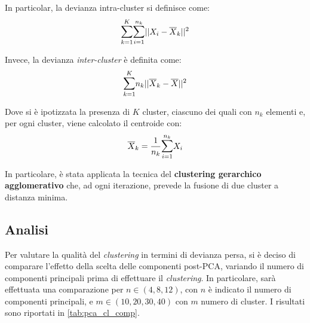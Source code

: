 In particolar, la devianza intra-cluster si definisce come:
\begin{equation*}
    \mathlarger{\sum}_{k=1}^K \mathlarger{\sum}_{i=1}^{n_k} ||X_i - \overline{X}_k||^2
\end{equation*}

Invece, la devianza \textit{inter-cluster} è definita come:
\begin{equation*}
     \mathlarger{\sum}_{k=1}^K n_k ||\overline{X}_k - \overline{X}||^2
\end{equation*}

 
Dove si è ipotizzata la presenza di $K$ cluster, ciascuno dei quali con $n_k$ elementi e, per ogni cluster, viene calcolato il centroide con:
\begin{equation*}
    \overline{X}_k = \frac{1}{n_k} \mathlarger{\sum}_{i=1}^{n_k} X_i
\end{equation*}
 
In particolare, è stata applicata la tecnica del \textbf{clustering gerarchico agglomerativo} che, ad ogni iterazione, prevede la fusione di due cluster a distanza minima. 
 

 \subsection{Analisi}
 Per valutare la qualità del \textit{clustering} in termini di devianza persa, si è deciso di comparare l'effetto della scelta delle componenti post-PCA, variando il numero di componenti principali prima di effettuare il \textit{clustering}. In particolare, sarà effettuata una comparazione per $n \in (4, 8, 12)$, con $n$ è indicato il numero di componenti principali, e $m \in (10, 20, 30, 40)$ con $m$ numero di cluster. I risultati sono riportati in \cref{tab:pca_cl_comp}.


